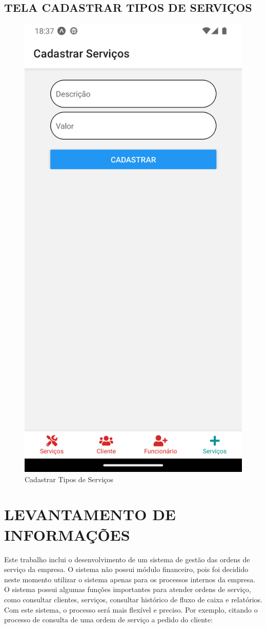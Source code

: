 \subsection{TELA CADASTRAR TIPOS DE SERVIÇOS}
\begin{figure}[htb]
	\caption{\label{fig_diagrama-classes} Cadastrar Tipos de Serviços}
	\begin{center}
	    \includegraphics[width=0.5\linewidth]{imagens/tela-cadastrar-servico.png}
	\end{center}
\end{figure}

\newpage

\section{LEVANTAMENTO DE INFORMAÇÕES}
Este trabalho inclui o desenvolvimento de um sistema de gestão das ordens de serviço da empresa. O sistema não possui módulo financeiro, pois foi decidido neste momento utilizar o sistema apenas para os processos internos da empresa. O sistema possui algumas funções importantes para atender ordens de serviço, como consultar clientes, serviços, consultar histórico de fluxo de caixa \cite{caixa} e relatórios. Com este sistema, o processo será mais flexível e preciso. Por exemplo, citando o processo de consulta de uma ordem de serviço a pedido do cliente:


